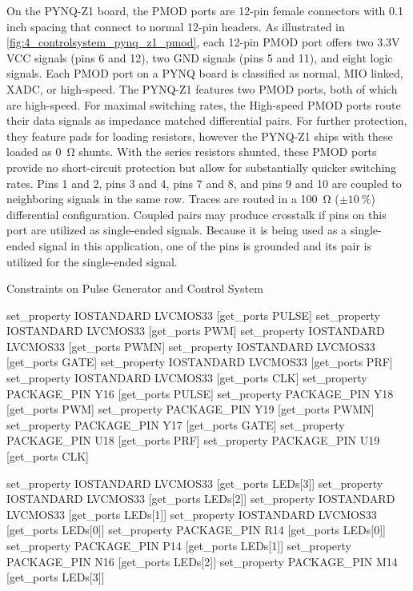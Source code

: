 On the PYNQ-Z1 board, the PMOD ports are 12-pin female connectors with 0.1 inch spacing that connect to normal 12-pin headers. As illustrated in \cref{fig:4_controlsystem_pynq_z1_pmod}, each 12-pin PMOD port offers two 3.3V VCC signals (pins 6 and 12), two GND signals (pins 5 and 11), and eight logic signals. Each PMOD port on a PYNQ board is classified as normal, MIO linked, XADC, or high-speed. The PYNQ-Z1 features two PMOD ports, both of which are high-speed. For maximal switching rates, the High-speed PMOD ports route their data signals as impedance matched differential pairs. For further protection, they feature pads for loading resistors, however the PYNQ-Z1 ships with these loaded as \qty{0}{\ohm} shunts. With the series resistors shunted, these PMOD ports provide no short-circuit protection but allow for substantially quicker switching rates. Pins 1 and 2, pins 3 and 4, pins 7 and 8, and pins 9 and 10 are coupled to neighboring signals in the same row. Traces are routed in a \qty{100}{\ohm} ($\pm\qty{10}{\percent}$) differential configuration. Coupled pairs may produce crosstalk if pins on this port are utilized as single-ended signals. Because it is being used as a single-ended signal in this application, one of the pins is grounded and its pair is utilized for the single-ended signal.

\begin{listing}[htbp]
	\caption{Constraints on Pulse Generator and Control System}
	\label{lst:4_controlsystem_constraints}
	\begin{mintedvhdl}
set_property IOSTANDARD LVCMOS33 [get_ports PULSE]
set_property IOSTANDARD LVCMOS33 [get_ports PWM]
set_property IOSTANDARD LVCMOS33 [get_ports PWMN]
set_property IOSTANDARD LVCMOS33 [get_ports GATE]
set_property IOSTANDARD LVCMOS33 [get_ports PRF]
set_property IOSTANDARD LVCMOS33 [get_ports CLK]
set_property PACKAGE_PIN Y16 [get_ports PULSE]
set_property PACKAGE_PIN Y18 [get_ports PWM]
set_property PACKAGE_PIN Y19 [get_ports PWMN]
set_property PACKAGE_PIN Y17 [get_ports GATE]
set_property PACKAGE_PIN U18 [get_ports PRF]
set_property PACKAGE_PIN U19 [get_ports CLK]

set_property IOSTANDARD LVCMOS33 [get_ports {LEDs[3]}]
set_property IOSTANDARD LVCMOS33 [get_ports {LEDs[2]}]
set_property IOSTANDARD LVCMOS33 [get_ports {LEDs[1]}]
set_property IOSTANDARD LVCMOS33 [get_ports {LEDs[0]}]
set_property PACKAGE_PIN R14 [get_ports {LEDs[0]}]
set_property PACKAGE_PIN P14 [get_ports {LEDs[1]}]
set_property PACKAGE_PIN N16 [get_ports {LEDs[2]}]
set_property PACKAGE_PIN M14 [get_ports {LEDs[3]}]
	\end{mintedvhdl}
\end{listing}

